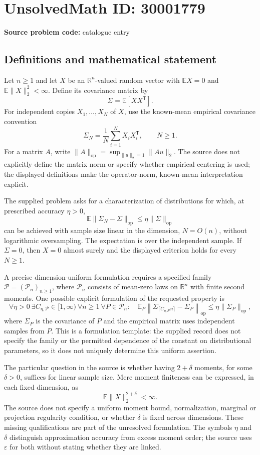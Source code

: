 \documentclass[11pt]{article}
\newcommand{\R}{\mathbb{R}}
\newcommand{\E}{\mathbb{E}}
\begin{document}
\section*{UnsolvedMath ID: 30001779}
\textbf{Source problem code:} catalogue entry
\subsection{Definitions and mathematical statement}
Let \(n\geq 1\) and let \(X\) be an \(\R^n\)-valued random vector with \(\E X=0\) and \(\E\|X\|_2^2<\infty\). Define its covariance matrix by
\[
\Sigma=\E[XX^{\mathsf T}].
\]
For independent copies \(X_1,\ldots,X_N\) of \(X\), use the known-mean empirical covariance convention
\[
\Sigma_N=\frac{1}{N}\sum_{i=1}^N X_iX_i^{\mathsf T},\qquad N\geq 1.
\]
For a matrix \(A\), write \(\|A\|_{\mathrm{op}}=\sup_{\|u\|_2=1}\|Au\|_2\). The source does not explicitly define the matrix norm or specify whether empirical centering is used; the displayed definitions make the operator-norm, known-mean interpretation explicit.

The supplied problem asks for a characterization of distributions for which, at prescribed accuracy \(\eta>0\),
\[
\E\|\Sigma_N-\Sigma\|_{\mathrm{op}}
\leq \eta\|\Sigma\|_{\mathrm{op}}
\]
can be achieved with sample size linear in the dimension, \(N=O(n)\), without logarithmic oversampling. The expectation is over the independent sample. If \(\Sigma=0\), then \(X=0\) almost surely and the displayed criterion holds for every \(N\geq1\).

A precise dimension-uniform formulation requires a specified family \(\mathcal P=(\mathcal P_n)_{n\geq1}\), where \(\mathcal P_n\) consists of mean-zero laws on \(\R^n\) with finite second moments. One possible explicit formulation of the requested property is
\[
\forall\eta>0\ \exists C_{\eta,\mathcal P}\in[1,\infty)\ \forall n\geq1\ \forall P\in\mathcal P_n:\quad
\E_P\left\|\Sigma_{\lceil C_{\eta,\mathcal P}n\rceil}-\Sigma_P\right\|_{\mathrm{op}}
\leq\eta\|\Sigma_P\|_{\mathrm{op}},
\]
where \(\Sigma_P\) is the covariance of \(P\) and the empirical matrix uses independent samples from \(P\). This is a formulation template: the supplied record does not specify the family or the permitted dependence of the constant on distributional parameters, so it does not uniquely determine this uniform assertion.

The particular question in the source is whether having \(2+\delta\) moments, for some \(\delta>0\), suffices for linear sample size. Mere moment finiteness can be expressed, in each fixed dimension, as
\[
\E\|X\|_2^{2+\delta}<\infty.
\]
The source does not specify a uniform moment bound, normalization, marginal or projection regularity condition, or whether \(\delta\) is fixed across dimensions. These missing qualifications are part of the unresolved formulation. The symbols \(\eta\) and \(\delta\) distinguish approximation accuracy from excess moment order; the source uses \(\varepsilon\) for both without stating whether they are linked.
\end{document}
